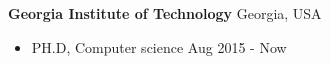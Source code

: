 \documentclass[11pt]{article}
\renewcommand{\section}[1]{\pagebreak[3]%
    \hyphenpenalty=10000%
    \vspace{1.3\baselineskip}%
    \phantomsection\addcontentsline{toc}{section}{#1}%
    \noindent\llap{\scshape\smash{\parbox[t]{\marginparwidth}{\raggedright \large #1}}}%
    \vspace{-\baselineskip}\par}
\newenvironment{outerlist}[1][\enskip\textbullet]%
        {\begin{itemize}[#1,leftmargin=*]}{\end{itemize}%
         \vspace{-.6\baselineskip}}
\newenvironment{innerlist}[1][\enskip\textbullet]%
        {\begin{itemize}[#1,leftmargin=*,parsep=0pt,itemsep=0pt,topsep=0pt,partopsep=0pt]}
        {\end{itemize}}
\begin{document}
\textbf{Georgia Institute of Technology} \hfill Georgia, USA
\begin{outerlist}
\item[] PH.D, Computer science  \hfill Aug 2015 - Now\\
\end{outerlist}

\begin{comment}
\section{Work Experience}
\textbf{Korea Cyber Command} \hfill {Seoul, South Korea}
\begin{innerlist}
\item[] Software Developer  \hfill {Apr 2012 to Jan 2014}\\
    \begin{innerlist}
        \item Developed security software used in the army.
        \item Windows malware reverse engineering.
        \item Writing exploits for commodity softwares.
        \item Threat response and management.
    \end{innerlist}
\end{innerlist}
\end{comment}
\end{document}
